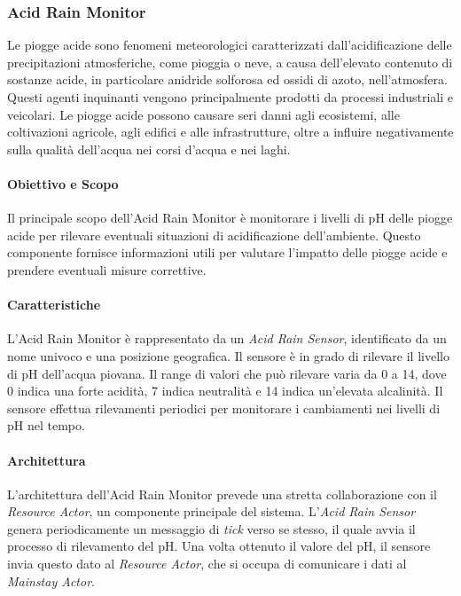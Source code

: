 \documentclass[12pt]{article}
\begin{document}
\subsubsection{Acid Rain Monitor}
Le piogge acide sono fenomeni meteorologici caratterizzati dall'acidificazione delle precipitazioni atmosferiche, come pioggia o neve, a causa dell'elevato contenuto di sostanze acide, in particolare anidride solforosa ed ossidi di azoto, nell'atmosfera. Questi agenti inquinanti vengono principalmente prodotti da processi industriali e veicolari. Le piogge acide possono causare seri danni agli ecosistemi, alle coltivazioni agricole, agli edifici e alle infrastrutture, oltre a influire negativamente sulla qualità dell'acqua nei corsi d'acqua e nei laghi.

\paragraph{Obiettivo e Scopo}
Il principale scopo dell'Acid Rain Monitor è monitorare i livelli di pH delle piogge acide per rilevare eventuali situazioni di acidificazione dell'ambiente. Questo componente fornisce informazioni utili per valutare l'impatto delle piogge acide e prendere eventuali misure correttive.

\paragraph{Caratteristiche}
L'Acid Rain Monitor è rappresentato da un \textit{Acid Rain Sensor}, identificato da un nome univoco e una posizione geografica. Il sensore è in grado di rilevare il livello di pH dell'acqua piovana. Il range di valori che può rilevare varia da 0 a 14, dove 0 indica una forte acidità, 7 indica neutralità e 14 indica un'elevata alcalinità. Il sensore effettua rilevamenti periodici per monitorare i cambiamenti nei livelli di pH nel tempo.

\paragraph{Architettura}
L'architettura dell'Acid Rain Monitor prevede una stretta collaborazione con il \textit{Resource Actor}, un componente principale del sistema. L'\textit{Acid Rain Sensor} genera periodicamente un messaggio di \textit{tick} verso se stesso, il quale avvia il processo di rilevamento del pH. Una volta ottenuto il valore del pH, il sensore invia questo dato al \textit{Resource Actor}, che si occupa di comunicare i dati al \textit{Mainstay Actor}.
\end{document}
